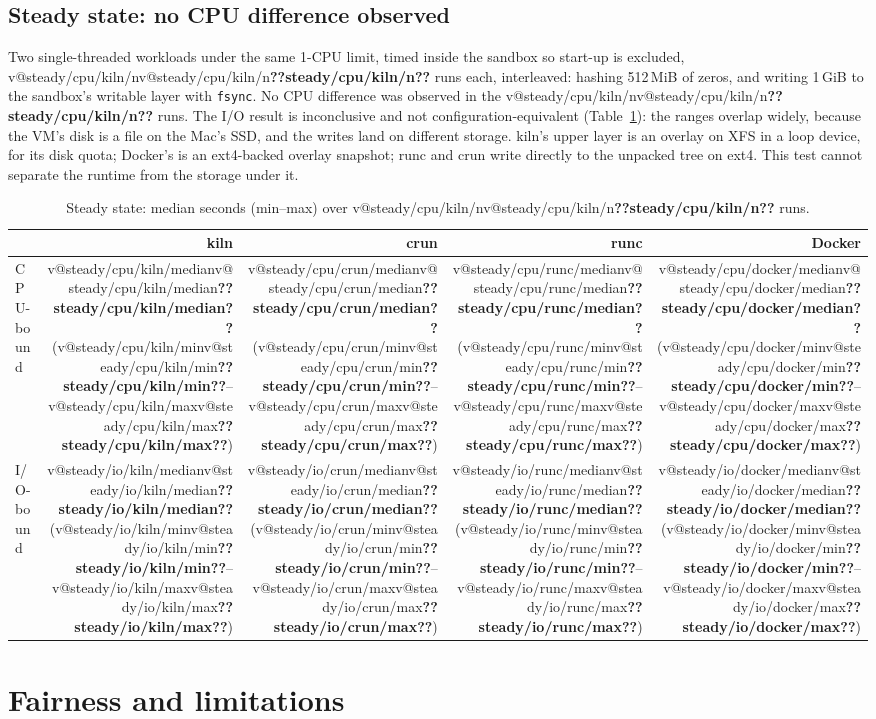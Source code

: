 \documentclass[10pt,letterpaper]{article}
\makeatletter
\newcommand{\code}[1]{\texttt{#1}}
\newcommand{\V}[1]{\ifcsname v@#1\endcsname\csname v@#1\endcsname\else\textbf{??#1??}\fi}
\makeatother
\begin{document}
\subsection{Steady state: no CPU difference observed}
\label{sec:steady}

Two single-threaded workloads under the same 1-CPU limit, timed inside the
sandbox so start-up is excluded, \V{steady/cpu/kiln/n} runs each, interleaved:
hashing 512\,MiB of zeros, and writing 1\,GiB to the sandbox's writable layer
with \code{fsync}. No CPU difference was observed in the
\V{steady/cpu/kiln/n} runs. The I/O result is inconclusive and not
configuration-equivalent (Table~\ref{tab:steady}): the ranges overlap widely,
because the VM's disk is a file on the Mac's SSD, and the writes land on
different storage. kiln's upper layer is an overlay on XFS in a loop device, for
its disk quota; Docker's is an ext4-backed overlay snapshot; runc and crun write
directly to the unpacked tree on ext4. This test cannot separate the runtime
from the storage under it.

\begin{table}[H]
\centering\small
\caption{Steady state: median seconds (min--max) over \V{steady/cpu/kiln/n} runs.}
\label{tab:steady}
\begin{tabular}{@{}lrrrr@{}}
\toprule
 & kiln & crun & runc & Docker \\
\midrule
CPU-bound & \V{steady/cpu/kiln/median} (\V{steady/cpu/kiln/min}--\V{steady/cpu/kiln/max}) & \V{steady/cpu/crun/median} (\V{steady/cpu/crun/min}--\V{steady/cpu/crun/max}) & \V{steady/cpu/runc/median} (\V{steady/cpu/runc/min}--\V{steady/cpu/runc/max}) & \V{steady/cpu/docker/median} (\V{steady/cpu/docker/min}--\V{steady/cpu/docker/max}) \\
I/O-bound & \V{steady/io/kiln/median} (\V{steady/io/kiln/min}--\V{steady/io/kiln/max}) & \V{steady/io/crun/median} (\V{steady/io/crun/min}--\V{steady/io/crun/max}) & \V{steady/io/runc/median} (\V{steady/io/runc/min}--\V{steady/io/runc/max}) & \V{steady/io/docker/median} (\V{steady/io/docker/min}--\V{steady/io/docker/max}) \\
\bottomrule
\end{tabular}
\end{table}

\section{Fairness and limitations}
\label{sec:fair}
\end{document}
